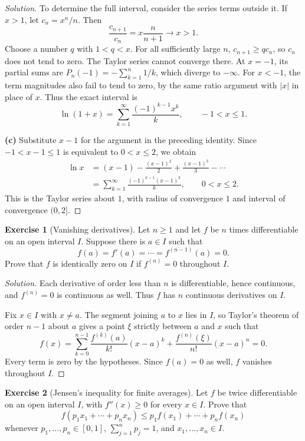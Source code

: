 \documentclass[11pt,letterpaper]{article}
\theoremstyle{definition}
\newtheorem{exercise}{Exercise}
\begin{document}
\begin{proof}[Solution]
  To determine the full interval, consider the series terms outside it.
  If $x>1$, let $c_n=x^n/n$. Then
  \[
    \frac{c_{n+1}}{c_n}=x\frac{n}{n+1}\longrightarrow x>1.
  \]
  Choose a number $q$ with $1<q<x$. For all sufficiently large $n$,
  $c_{n+1}\ge q c_n$, so $c_n$ does not tend to zero. The Taylor series
  cannot converge there. At $x=-1$, its partial sums are
  $P_n(-1)=-\sum_{k=1}^{n}1/k$, which diverge to $-\infty$.
  For $x<-1$, the term magnitudes also fail to tend to zero, by the same
  ratio argument with $|x|$ in place of $x$. Thus the exact interval is
  \[
    \ln(1+x)=\sum_{k=1}^{\infty}\frac{(-1)^{k-1}x^k}{k},
    \qquad -1<x\le1.
  \]

  \textbf{(c)} Substitute $x-1$ for the argument in the preceding
  identity. Since $-1<x-1\le1$ is equivalent to $0<x\le2$, we obtain
  \[
    \begin{aligned}
      \ln x
        &=(x-1)-\frac{(x-1)^2}{2}+\frac{(x-1)^3}{3}-\cdots\\
        &=\sum_{k=1}^{\infty}\frac{(-1)^{k-1}(x-1)^k}{k},
        \qquad 0<x\le2.
    \end{aligned}
  \]
  This is the Taylor series about $1$, with radius of convergence $1$
  and interval of convergence $(0,2]$.
\end{proof}

\begin{exercise}[Vanishing derivatives]
  \label{ex:standalone-hw08:vanishing-derivatives}
  Let $n\ge1$ and let $f$ be $n$ times differentiable on an open interval
  $I$. Suppose there is $a\in I$ such that
  \[
    f(a)=f'(a)=\cdots=f^{(n-1)}(a)=0.
  \]
  Prove that $f$ is identically zero on $I$ if $f^{(n)}=0$ throughout $I$.
\end{exercise}

\begin{proof}[Solution]
  Each derivative of order less than $n$ is differentiable, hence
  continuous, and $f^{(n)}=0$ is continuous as well. Thus $f$ has $n$
  continuous derivatives on $I$.

  Fix $x\in I$ with $x\ne a$. The segment joining $a$ to $x$ lies in
  $I$, so Taylor's theorem of order $n-1$ about $a$ gives a point
  $\xi$ strictly between $a$ and $x$ such that
  \[
    f(x)=\sum_{k=0}^{n-1}\frac{f^{(k)}(a)}{k!}(x-a)^k
      +\frac{f^{(n)}(\xi)}{n!}(x-a)^n=0.
  \]
  Every term is zero by the hypotheses. Since $f(a)=0$ as well,
  $f$ vanishes throughout $I$.
\end{proof}

\begin{exercise}[Jensen's inequality for finite averages]
  \label{ex:standalone-hw08:jensen}
  Let $f$ be twice differentiable on an open interval $I$, with
  $f''(x)\ge0$ for every $x\in I$. Prove that
  \[
    f(p_1x_1+\cdots+p_nx_n)
      \le p_1f(x_1)+\cdots+p_nf(x_n)
  \]
  whenever $p_1,\ldots,p_n\in[0,1]$, $\sum_{j=1}^{n}p_j=1$, and
  $x_1,\ldots,x_n\in I$.
\end{exercise}
\end{document}
